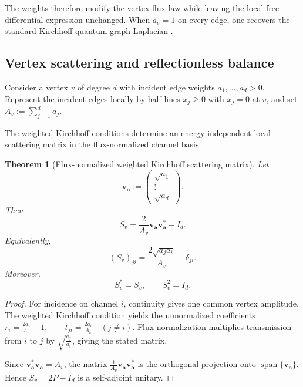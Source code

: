 \documentclass[11pt]{article}
\theoremstyle{plain}
\newtheorem{theorem}{Theorem}[section]
\theoremstyle{definition}
\begin{document}
The weights therefore modify the vertex flux law while leaving the local
free differential expression unchanged. When \(a_e=1\) on every edge, one recovers the standard Kirchhoff quantum-graph Laplacian
\citep{Kuchment04,BerkolaikoKuchment2013}.

\subsection{Vertex scattering and reflectionless balance}
\label{subsec:vertex-scattering}

Consider a vertex \(v\) of degree \(d\) with incident edge weights
\(a_1,\ldots,a_d>0\).
Represent the incident edges locally by half-lines \(x_j\geq0\) with \(x_j=0\) at \(v\), and set
\(A_v := \sum_{j=1}^{d}a_j\).

The weighted Kirchhoff conditions determine an energy-independent local
scattering matrix in the flux-normalized channel basis.

\begin{theorem}[Flux-normalized weighted Kirchhoff scattering matrix]
\label{thm:weighted-vertex-S}
Let
\[
  \mathbf v_{\mathbf a}
  :=
  \begin{pmatrix}
    \sqrt{a_1}\\
    \vdots\\
    \sqrt{a_d}
  \end{pmatrix}.
\]
Then
\[
  S_v
  =
  \frac{2}{A_v}
  \mathbf v_{\mathbf a}
  \mathbf v_{\mathbf a}^{*}
  -
  I_d.
\]
Equivalently,
\[
  (S_v)_{ji}
  =
  \frac{2\sqrt{a_ja_i}}{A_v}
  -
  \delta_{ji}.
\]
Moreover,
\[
  S_v^*=S_v,
  \qquad
  S_v^2=I_d.
\]
\end{theorem}

\begin{proof}
For incidence on channel \(i\), continuity gives one common vertex
amplitude. The weighted Kirchhoff condition yields the unnormalized
coefficients
\(r_i=\frac{2a_i}{A_v}-1, \qquad t_{ji}=\frac{2a_i}{A_v} \quad (j\neq i)\).
Flux normalization multiplies transmission from \(i\) to \(j\) by
\(\sqrt{\frac{a_j}{a_i}}\),
giving the stated matrix.

Since
\(\mathbf v_{\mathbf a}^{*}\mathbf v_{\mathbf a}=A_v\),
the matrix \(\frac{1}{A_v} \mathbf v_{\mathbf a}\mathbf v_{\mathbf a}^{*}\) is the orthogonal projection onto
\(\operatorname{span}\{\mathbf v_{\mathbf a}\}\). Hence \(S_v=2P-I_d\) is a self-adjoint unitary.
\end{proof}
\end{document}
